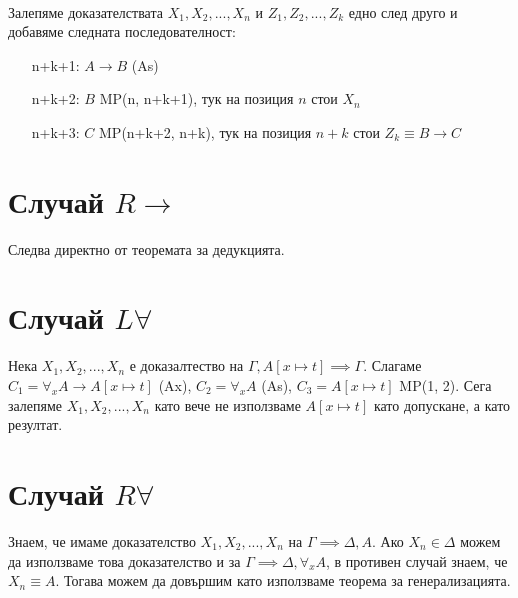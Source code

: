 \documentclass[12pt]{article}
\begin{document}
\paragraph*{}
Залепяме доказателствата $X_1, X_2, ..., X_n$ и $Z_1, Z_2, ..., Z_k$ едно след друго и добавяме следната последователност:
\begin{itemize}[itemindent=4em]
    \item[n+k+1: ] $A \rightarrow B$ (As)
    \item[n+k+2: ] $B$ MP(n, n+k+1), тук на позиция $n$ стои $X_n$  
    \item[n+k+3: ] $C$ MP(n+k+2, n+k), тук на позиция $n+k$ стои $Z_k \equiv B \rightarrow C$  
\end{itemize}

\section*{Случай $R \rightarrow$}
Следва директно от теоремата за дедукцията.

\section*{Случай $L \forall$}
Нека $X_1, X_2, ..., X_n$ е доказалтество на $\Gamma, A[x \longmapsto t] \implies \Gamma$. Слагаме $C_1 = \forall_x A \rightarrow A[x \longmapsto t]$ (Ax), $C_2 = \forall_x A$ (As), $C_3 = A[x \longmapsto t]$ MP(1, 2). Сега залепяме $X_1, X_2, ..., X_n$ като вече не използваме $A[x \longmapsto t]$ като допускане, а като резултат.

\section*{Случай $R \forall$}
Знаем, че имаме доказателство $X_1, X_2, ..., X_n$ на $\Gamma \implies \Delta, A$. Ако $X_n \in \Delta$ можем да използваме това доказателство и за $\Gamma \implies \Delta, \forall_x A$, в противен случай знаем, че $X_n \equiv A$. Тогава можем да довършим като използваме теорема за генерализацията.
\end{document}
